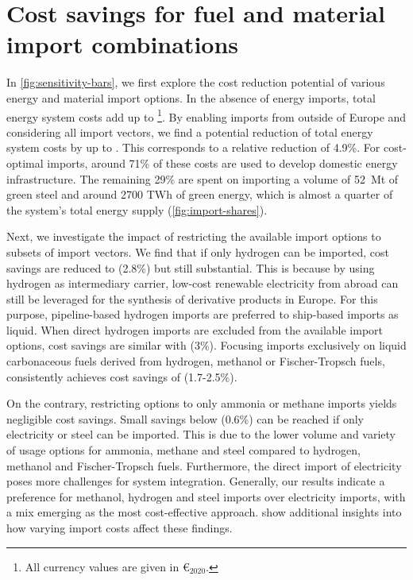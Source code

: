 \section*{Cost savings for fuel and material import combinations}

In \cref{fig:sensitivity-bars}, we first explore the cost reduction potential of
various energy and material import options. In the absence of energy imports,
total energy system costs add up to \footnote{All currency values
are given in \euro{}$_{2020}$.}. By enabling imports from outside of Europe and
considering all import vectors, we find a potential reduction of total energy
system costs by up to . This corresponds to a relative reduction of
4.9\%. For cost-optimal imports, around 71\% of these costs are used to develop
domestic energy infrastructure. The remaining 29\% are spent on importing a
volume of 52~Mt of green steel and around 2700 TWh of green energy, which is
almost a quarter of the system's total energy supply (\cref{fig:import-shares}).

Next, we investigate the impact of restricting the available import options to
subsets of import vectors. We find that if only hydrogen can be imported, cost
savings are reduced to  (2.8\%) but still substantial. This is
because by using hydrogen as intermediary carrier, low-cost renewable
electricity from abroad can still be leveraged for the synthesis of derivative
products in Europe. For this purpose, pipeline-based hydrogen imports are
preferred to ship-based imports as liquid. When direct hydrogen imports are
excluded from the available import options, cost savings are similar with
 (3\%). Focusing imports exclusively on liquid carbonaceous
fuels derived from hydrogen, methanol or Fischer-Tropsch fuels, consistently
achieves cost savings of  (1.7-2.5\%).

On the contrary, restricting options to only ammonia or methane imports yields
negligible cost savings. Small savings below  (0.6\%) can be reached
if only electricity or steel can be imported. This is due to the lower volume
and variety of usage options for ammonia, methane and steel compared to
hydrogen, methanol and Fischer-Tropsch fuels. Furthermore, the direct import of
electricity poses more challenges for system integration. Generally, our results
indicate a preference for methanol, hydrogen and steel imports over electricity
imports, with a mix emerging as the most cost-effective approach.
 show additional insights into how varying import costs
affect these findings.

